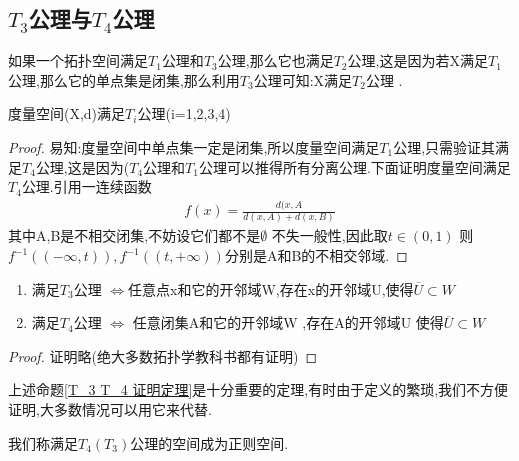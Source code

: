 \subsection*{\(T_3\)公理与\(T_4\)公理}
如果一个拓扑空间满足\(T_1\)公理和\(T_3\)公理,那么它也满足\(T_2\)公理,这是因为若X满足\(T_1\)公理,那么它的单点集是闭集,那么利用\(T_3\)公理可知:X满足\(T_2\)公理 . 
\begin{corollary}
    度量空间(X,d)满足\(T_i\)公理(i=1,2,3,4)
\end{corollary}
\begin{proof}
    易知:度量空间中单点集一定是闭集,所以度量空间满足\(T_1\)公理,只需验证其满足\(T_4\)公理,这是因为(\(T_4\)公理和\(T_1\)公理可以推得所有分离公理.下面证明度量空间满足\(T_4\)公理.引用一连续函数\begin{align}
        f(x)=\frac{d(x,A}{d(x,A)+d(x,B)}
    \end{align}
    其中A,B是不相交闭集,不妨设它们都不是\(\emptyset\) 不失一般性,因此取\(t \in (0,1)\) 则\(f^{-1}((-\infty,t)),f^{-1}((t,+\infty))\)分别是A和B的不相交邻域.
\end{proof}
\begin{corollary}\label{T_3 T_4 证明定理}
    \begin{enumerate}
        \item 满足\(T_3\)公理 \(\Leftrightarrow\)任意点x和它的开邻域W,存在x的开邻域U,使得\(\overline{U} \subset W\) \\
        \item 满足\(T_4\)公理 \(\Leftrightarrow\) 任意闭集A和它的开邻域W ,存在A的开邻域U 使得\(\overline{U} \subset W\)
    \end{enumerate}
\end{corollary}
\begin{proof}
    证明略(绝大多数拓扑学教科书都有证明)
\end{proof}
\begin{note}
    上述命题\ref{T_3 T_4 证明定理}是十分重要的定理,有时由于定义的繁琐,我们不方便证明,大多数情况可以用它来代替.
\end{note}
\begin{definition}
    我们称满足\(T_4(T_3)\)公理的空间成为正则空间.
\end{definition}
